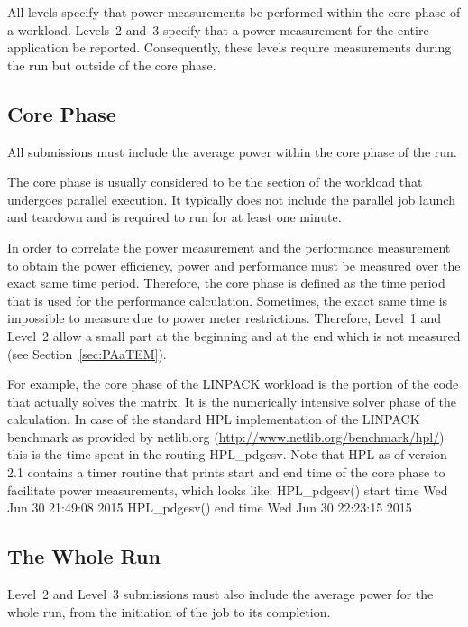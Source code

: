 All levels specify that power measurements be performed within the core phase of a workload.
Levels~2 and~3 specify that a power measurement for the entire application be reported.
Consequently, these levels require measurements during the run but outside of the core phase.

\subsection{Core Phase}
\label{sec:core_phase}

All submissions must include the average power within the core phase of the run.

The core phase is usually considered to be the section of the workload that undergoes parallel execution.
It typically does not include the parallel job launch and teardown and is required to run for at least one minute.

In order to correlate the power measurement and the performance measurement to obtain the power efficiency, power and performance must be measured over the exact same time period.
Therefore, the core phase is defined as the time period that is used for the performance calculation.
Sometimes, the exact same time is impossible to measure due to power meter restrictions.
Therefore, Level~1 and Level~2 allow a small part at the beginning and at the end which is not measured (see Section~\ref{sec:PAaTEM}).

For example, the core phase of the LINPACK workload is the portion of the code that actually solves the matrix.
It is the numerically intensive solver phase of the calculation.
In case of the standard \acs{HPL} implementation of the LINPACK benchmark as provided by netlib.org (\url{http://www.netlib.org/benchmark/hpl/}) this is the time spent in the routing {\ttfamily HPL\_pdgesv}.
Note that \acs{HPL} as of version 2.1 contains a timer routine that prints start and end time of the core phase to facilitate power measurements, which looks like:\newline
{\ttfamily
HPL\_pdgesv() start time Wed Jun 30 21:49:08 2015\newline
HPL\_pdgesv() end time Wed Jun 30 22:23:15 2015
}.

\subsection{The Whole Run}

Level~2 and Level~3 submissions must also include the average power for the whole run, from the initiation of the job to its completion.

